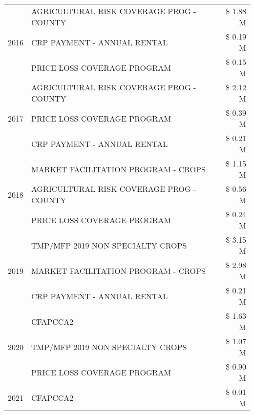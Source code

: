 \begin{tabular}{llr}
\cline{1-3}
\multirow[t]{3}{*}{2016} & AGRICULTURAL RISK COVERAGE PROG - COUNTY & \$ 1.88 M \\
 & CRP PAYMENT - ANNUAL RENTAL & \$ 0.19 M \\
 & PRICE LOSS COVERAGE PROGRAM & \$ 0.15 M \\
\cline{1-3}
\multirow[t]{3}{*}{2017} & AGRICULTURAL RISK COVERAGE PROG - COUNTY & \$ 2.12 M \\
 & PRICE LOSS COVERAGE PROGRAM & \$ 0.39 M \\
 & CRP PAYMENT - ANNUAL RENTAL & \$ 0.21 M \\
\cline{1-3}
\multirow[t]{3}{*}{2018} & MARKET FACILITATION PROGRAM - CROPS & \$ 1.15 M \\
 & AGRICULTURAL RISK COVERAGE PROG - COUNTY & \$ 0.56 M \\
 & PRICE LOSS COVERAGE PROGRAM & \$ 0.24 M \\
\cline{1-3}
\multirow[t]{3}{*}{2019} & TMP/MFP 2019 NON SPECIALTY CROPS & \$ 3.15 M \\
 & MARKET FACILITATION PROGRAM - CROPS & \$ 2.98 M \\
 & CRP PAYMENT - ANNUAL RENTAL & \$ 0.21 M \\
\cline{1-3}
\multirow[t]{3}{*}{2020} & CFAPCCA2 & \$ 1.63 M \\
 & TMP/MFP 2019 NON SPECIALTY CROPS & \$ 1.07 M \\
 & PRICE LOSS COVERAGE PROGRAM & \$ 0.90 M \\
\cline{1-3}
2021 & CFAPCCA2 & \$ 0.01 M \\
\cline{1-3}
\bottomrule
\end{tabular}
